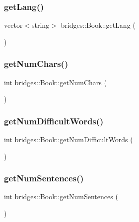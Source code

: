 \subsubsection{\texorpdfstring{get\+Lang()}{getLang()}}
{\footnotesize\ttfamily vector$<$string$>$ bridges\+::\+Book\+::get\+Lang (\begin{DoxyParamCaption}{ }\end{DoxyParamCaption})\hspace{0.3cm}{\ttfamily [inline]}}

\hypertarget{classbridges_1_1_book_ad84753469316165a26e33abfe7d61861}{}\label{classbridges_1_1_book_ad84753469316165a26e33abfe7d61861} 
\subsubsection{\texorpdfstring{get\+Num\+Chars()}{getNumChars()}}
{\footnotesize\ttfamily int bridges\+::\+Book\+::get\+Num\+Chars (\begin{DoxyParamCaption}{ }\end{DoxyParamCaption})\hspace{0.3cm}{\ttfamily [inline]}}

\hypertarget{classbridges_1_1_book_ae8e8b7b3b12e86ac7bb121aca1a14512}{}\label{classbridges_1_1_book_ae8e8b7b3b12e86ac7bb121aca1a14512} 
\subsubsection{\texorpdfstring{get\+Num\+Difficult\+Words()}{getNumDifficultWords()}}
{\footnotesize\ttfamily int bridges\+::\+Book\+::get\+Num\+Difficult\+Words (\begin{DoxyParamCaption}{ }\end{DoxyParamCaption})\hspace{0.3cm}{\ttfamily [inline]}}

\hypertarget{classbridges_1_1_book_aef8e6b378e0d86124f79ea1283666333}{}\label{classbridges_1_1_book_aef8e6b378e0d86124f79ea1283666333} 
\subsubsection{\texorpdfstring{get\+Num\+Sentences()}{getNumSentences()}}
{\footnotesize\ttfamily int bridges\+::\+Book\+::get\+Num\+Sentences (\begin{DoxyParamCaption}{ }\end{DoxyParamCaption})\hspace{0.3cm}{\ttfamily [inline]}}

